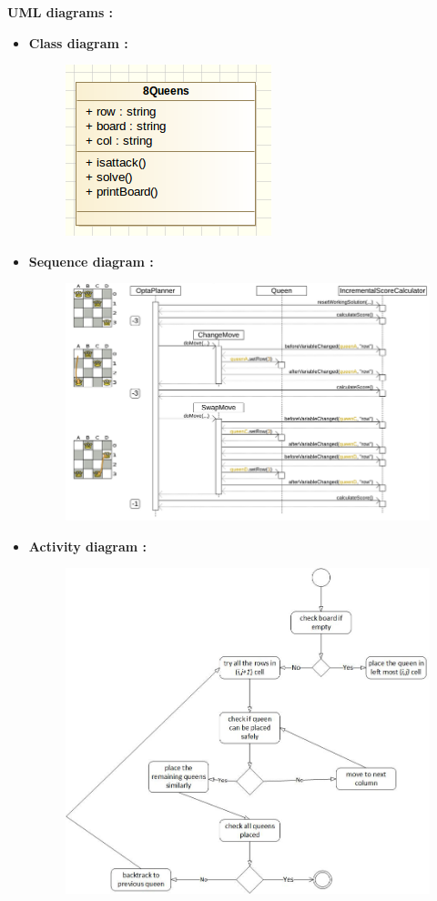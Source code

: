 \documentclass[a4paper,12pt]{article}
\begin{document}
\noindent \textbf{UML diagrams :}\\
\begin{itemize}
\item \textbf{Class diagram :}
\begin{figure}[h!]
		\centering
		\includegraphics[scale=0.5]{class_diagram.png}
	\end{figure}
\item \textbf{Sequence diagram :}
\begin{figure}[h!]
		\centering
		\includegraphics[scale=0.5]{Seq8queens.png}
	\end{figure}
	
\item \textbf{Activity diagram :}
\begin{figure}[h!]
		\centering
		\includegraphics[scale=0.5]{activity8queen.jpg}
	\end{figure}
	

\end{itemize}
\end{document}
